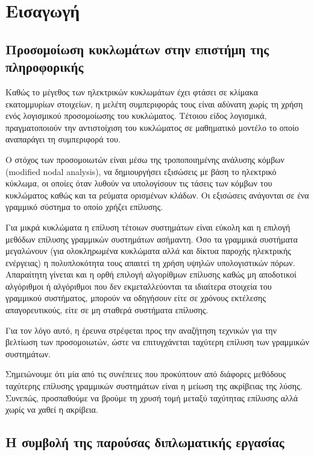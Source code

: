 ﻿
\chapter{Εισαγωγή}
\label{ch:1.chapterIntroduction}

\section{Προσομοίωση κυκλωμάτων στην επιστήμη της πληροφορικής}

Καθώς το μέγεθος των ηλεκτρικών κυκλωμάτων έχει φτάσει σε κλίμακα εκατομμυρίων στοιχείων, η μελέτη συμπεριφοράς τους είναι αδύνατη χωρίς τη χρήση ενός λογισμικού προσομοίωσης του κυκλώματος. Τέτοιου είδος λογισμικά, πραγματοποιούν την αντιστοίχιση του κυκλώματος σε μαθηματικό μοντέλο το οποίο αναπαράγει τη συμπεριφορά του.

Ο στόχος των προσομοιωτών είναι μέσω της τροποποιημένης ανάλυσης κόμβων (modified nodal analysis), να δημιουργήσει εξισώσεις με βάση το ηλεκτρικό κύκλωμα, οι οποίες όταν λυθούν να υπολογίσουν τις τάσεις των κόμβων του κυκλώματος καθώς και τα ρεύματα ορισμένων κλάδων. Οι εξισώσεις ανάγονται σε ένα γραμμικό σύστημα το οποίο χρήζει επίλυσης. 

Για μικρά κυκλώματα η επίλυση τέτοιων συστημάτων είναι εύκολη και η επιλογή μεθόδων επίλυσης γραμμικών συστημάτων ασήμαντη. Όσο τα γραμμικά συστήματα μεγαλώνουν (για ολοκληρωμένα κυκλώματα αλλά και δίκτυα παροχής ηλεκτρικής ενέργειας) η πολυπλοκότητα τους απαιτεί τη χρήση υψηλών υπολογιστικών πόρων. Απαραίτητη γίνεται και η ορθή επιλογή αλγορίθμων επίλυσης καθώς μη αποδοτικοί αλγόριθμοι ή αλγόριθμοι που δεν εκμεταλλεύονται τα ιδιαίτερα στοιχεία του γραμμικού συστήματος, μπορούν να οδηγήσουν είτε σε χρόνους εκτέλεσης απαγορευτικούς, είτε σε μη σταθερά συστήματα επίλυσης.

Για τον λόγο αυτό, η έρευνα στρέφεται προς την αναζήτηση τεχνικών για την βελτίωση των προσομοιωτών, ώστε να επιτυγχάνεται ταχύτερη επίλυση των γραμμικών συστημάτων.

Σημειώνουμε ότι μία από τις συνέπειες που προκύπτουν από διάφορες μεθόδους ταχύτερης επίλυσης γραμμικών συστημάτων είναι η μείωση της ακρίβειας της λύσης. Συνεπώς, προσπαθούμε να βρούμε τη χρυσή τομή μεταξύ ταχύτητας επίλυσης αλλά χωρίς να χαθεί η ακρίβεια.

\section{Η συμβολή της παρούσας διπλωματικής εργασίας}

